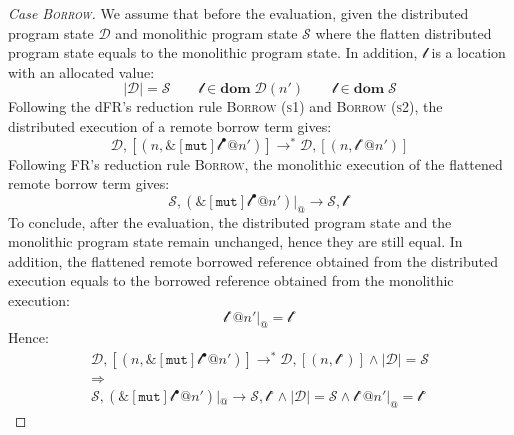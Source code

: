 \begin{proof}[Case \textsc{\emph{Borrow}}]
We assume that before the evaluation, given the distributed program state $\mathcal{D}$ and monolithic program state $\mathcal{S}$ where the flatten distributed program state equals to the monolithic program state. In addition, $\mathscr{l}$ is a location with an allocated value:
\[
|\mathcal{D}| = \mathcal{S} \quad\quad \mathscr{l} \in \textbf{dom}\; \mathcal{D}(n') \quad\quad \mathscr{l} \in \textbf{dom}\; \mathcal{S}
\]
Following the dFR's reduction rule \textsc{Borrow (s1)} and \textsc{Borrow (s2)}, the distributed execution of a remote borrow term gives:
\[
\mathcal{D}, [(n, \&[\texttt{mut}]\mathscr{l}^\bullet@n')] \longrightarrow^* \mathcal{D}, [(n, \mathscr{l}^\circ@n')]
\]
Following FR's reduction rule \textsc{Borrow}, the monolithic execution of the flattened remote borrow term gives:
\[
\mathcal{S}, (\&[\texttt{mut}]\mathscr{l}^\bullet@n')|_@ \longrightarrow \mathcal{S}, \mathscr{l}^\circ
\]
To conclude, after the evaluation, the distributed program state and the monolithic program state remain unchanged, hence they are still equal. In addition, the flattened remote borrowed reference obtained from the distributed execution equals to the borrowed reference obtained from the monolithic execution:
\[
\mathscr{l}^\circ@n'|_@ = \mathscr{l}^\circ
\]
Hence:
\begin{gather*}
\mathcal{D}, [(n, \&[\texttt{mut}]\mathscr{l}^\bullet@n')] \longrightarrow^* \mathcal{D}, [(n, \mathscr{l}^\circ)] \land |\mathcal{D}| = \mathcal{S} \\\Rightarrow\\ \mathcal{S}, (\&[\texttt{mut}]\mathscr{l}^\bullet@n')|_@ \longrightarrow \mathcal{S}, \mathscr{l}^\circ \land |\mathcal{D}| = \mathcal{S} \land \mathscr{l}^\circ@n'|_@ = \mathscr{l}^\circ
\end{gather*}
\end{proof}
